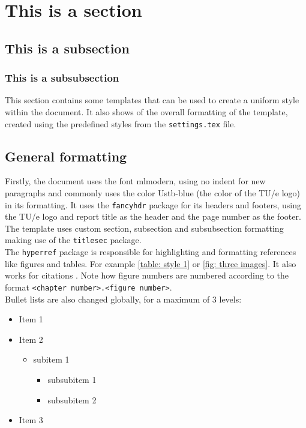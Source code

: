 \section{This is a section} 
\subsection{This is a subsection}

\subsubsection{This is a subsubsection}
This section contains some templates that can be used to create a uniform style within the document. It also shows of the overall formatting of the template, created using the predefined styles from the \texttt{settings.tex} file.

\subsection{General formatting}
Firstly, the document uses the font mlmodern, using no indent for new paragraphs and commonly uses the color \textcolor{Ustb-blue}{Ustb-blue} (the color of the TU/e logo) in its formatting. It uses the \texttt{fancyhdr} package for its headers and footers, using the TU/e logo and report title as the header and the page number as the footer. The template uses custom section, subsection and subsubsection formatting making use of the \texttt{titlesec} package.\\
The \texttt{hyperref} package is responsible for highlighting and formatting references like figures and tables. For example \cref{table: style 1} or \cref{fig: three images}. It also works for citations \cite{texbook}. Note how figure numbers are numbered according to the format \texttt{<chapter number>.<figure number>}.\\

Bullet lists are also changed globally, for a maximum of 3 levels:

\begin{itemize}
    \item Item 1
    \item Item 2
          \begin{itemize}
              \item subitem 1
                    \begin{itemize}
                        \item subsubitem 1
                        \item subsubitem 2
                    \end{itemize}
          \end{itemize}
    \item Item 3
\end{itemize}

